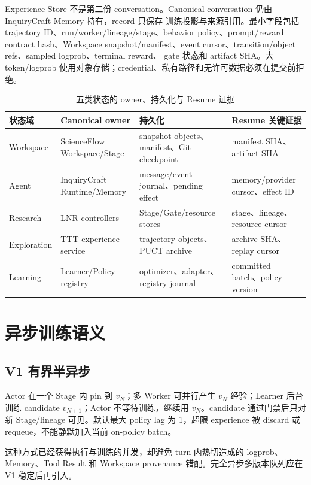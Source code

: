 \documentclass[UTF8,11pt,a4paper]{ctexart}
\begin{document}
Experience Store 不是第二份 conversation。Canonical conversation 仍由 InquiryCraft Memory 持有，record 只保存
训练投影与来源引用。最小字段包括 trajectory ID、run/worker/lineage/stage、behavior policy、prompt/reward
contract hash、Workspace snapshot/manifest、event cursor、transition/object refs、sampled logprob、terminal reward、
gate 状态和 artifact SHA。大 token/logprob 使用对象存储；credential、私有路径和无许可数据必须在提交前拒绝。

\begin{table}[htbp]
  \centering
  \caption{五类状态的 owner、持久化与 Resume 证据}
  \begin{tabularx}{\textwidth}{L{2.2cm}L{3.0cm}YY}
    \toprule
    状态域 & Canonical owner & 持久化 & Resume 关键证据 \\
    \midrule
    Workspace & ScienceFlow Workspace/Stage & snapshot objects、manifest、Git checkpoint & manifest SHA、artifact SHA \\
    Agent & InquiryCraft Runtime/Memory & message/event journal、pending effect & memory/provider cursor、effect ID \\
    Research & LNR controllers & Stage/Gate/resource stores & stage、lineage、resource cursor \\
    Exploration & TTT experience service & trajectory objects、PUCT archive & archive SHA、replay cursor \\
    Learning & Learner/Policy registry & optimizer、adapter、registry journal & committed batch、policy version \\
    \bottomrule
  \end{tabularx}
\end{table}

\section{异步训练语义}

\subsection{V1 有界半异步}

Actor 在一个 Stage 内 pin 到 $v_N$；多 Worker 可并行产生 $v_N$ 经验；Learner 后台训练 candidate
$v_{N+1}$；Actor 不等待训练，继续用 $v_N$。candidate 通过门禁后只对新 Stage/lineage 可见。默认最大 policy
lag 为 1，超限 experience 被 discard 或 requeue，不能静默加入当前 on-policy batch。

这种方式已经获得执行与训练的并发，却避免 turn 内热切造成的 logprob、Memory、Tool Result 和 Workspace provenance
错配。完全异步多版本队列应在 V1 稳定后再引入。
\end{document}
